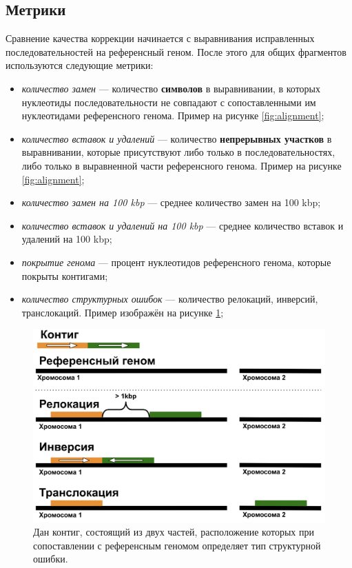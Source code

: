 \documentclass[14pt]{matmex-diploma-custom}
\begin{document}
\subsection{Метрики}
Сравнение качества коррекции начинается с выравнивания исправленных последовательностей на референсный геном. После этого для общих фрагментов используются следующие метрики:
\begin{itemize}
    \item \textit{количество замен} --- количество \textbf{символов} в выравнивании, в которых нуклеотиды последовательности не совпадают с сопоставленными им нуклеотидами референсного генома. Пример на рисунке \ref{fig:alignment};
    \item \textit{количество вставок и удалений} --- количество \textbf{непрерывных участков} в выравнивании, которые присутствуют либо только в последовательностях, либо только в выравненной части референсного генома. Пример на рисунке \ref{fig:alignment};
    \item \textit{количество замен на 100 kbp} --- среднее количество замен на 100 kbp;
    \item \textit{количество вставок и удалений на 100 kbp} --- среднее количество вставок и удалений на 100 kbp;
    \item \textit{покрытие генома} --- процент нуклеотидов референсного генома, которые покрыты контигами;
    \item \textit{количество структурных ошибок} --- количество релокаций, инверсий, транслокаций. Пример изображён на рисунке \ref{fig:miss};
\end{itemize}

\begin{figure}[h]
    \centering
    \includegraphics[scale=0.4]{misassemblies.png}
    \caption{Дан контиг, состоящий из двух частей, расположение которых при сопоставлении с референсным геномом определяет тип структурной ошибки.}
    \label{fig:miss}
\end{figure}
\end{document}
